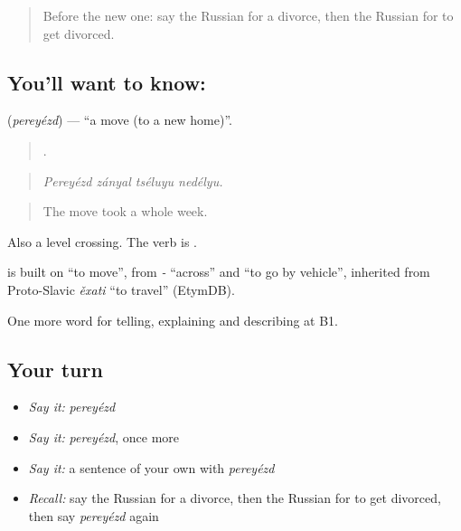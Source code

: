 \label{lesson:RU-C307-pereyezd}



\begin{quote}
Before the new one: say the Russian for a divorce, then the Russian for to get divorced.
\end{quote}

\subsection*{You'll want to know: }
\textbf{} (\emph{pereyézd}) — \textquotedblleft{}a move (to a new home)\textquotedblright{}.

\begin{quote}
   .
\end{quote}

\begin{quote}
\emph{Pereyézd zányal tséluyu nedélyu.}
\end{quote}

\begin{quote}
The move took a whole week.
\end{quote}

Also a level crossing. The verb is \emph{}.

\begin{cousinweb}
\emph{} is built on \emph{} \textquotedblleft{}to move\textquotedblright{}, from \emph{-} \textquotedblleft{}across\textquotedblright{} and \emph{} \textquotedblleft{}to go by vehicle\textquotedblright{}, inherited from Proto-Slavic \emph{ěxati} \textquotedblleft{}to travel\textquotedblright{} (EtymDB).
\end{cousinweb}

\begin{grammarlens}[title={What you've built}]
One more word for telling, explaining and describing at B1.
\end{grammarlens}

\subsection*{Your turn}
\begin{itemize}
\raggedright
  \item \emph{Say it:} \emph{pereyézd}
  \item \emph{Say it:} \emph{pereyézd}, once more
  \item \emph{Say it:} a sentence of your own with \emph{pereyézd}
  \item \emph{Recall:} say the Russian for a divorce, then the Russian for to get divorced, then say \emph{pereyézd} again
\end{itemize}

